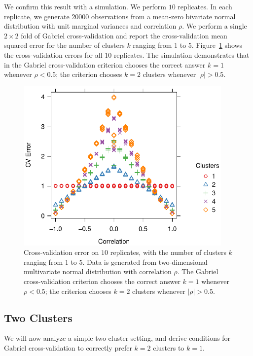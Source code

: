 \documentclass[11pt]{article}
\begin{document}
We confirm this result with a simulation.  We perform $10$ replicates.  In each
replicate, we generate $20000$ observations from a mean-zero bivariate normal
distribution with unit marginal variances and correlation $\rho$.  We perform
a single $2 \times 2$ fold of Gabriel cross-validation and report the
cross-validation mean squared error for the number of clusters $k$ ranging
from $1$ to $5$.  Figure~\ref{fig:nullcorr-equal} shows the cross-validation
errors for all $10$ replicates.  The simulation demonstrates that in the
Gabriel cross-validation criterion chooses the correct answer $k = 1$ whenever
$\rho < 0.5$; the criterion chooses $k = 2$ clusters whenever $|\rho| > 0.5$.

\begin{figure}[H]
\centering
\includegraphics[width=25pc]{demo/nullcorr/equal.pdf}
\caption{Cross-validation error on $10$ replicates, with the number of
clusters $k$ ranging from $1$ to $5$.  Data is generated from two-dimensional
multivariate normal distribution with correlation $\rho$.  The Gabriel
cross-validation criterion chooses the correct answer $k = 1$ whenever
$\rho < 0.5$; the criterion chooses $k = 2$ clusters whenever $|\rho| > 0.5$.}
\label{fig:nullcorr-equal}
\end{figure}


\subsection{Two Clusters}

We will now analyze a simple two-cluster setting, and derive conditions for
Gabriel cross-validation to correctly prefer $k=2$ clusters to $k=1$.
\end{document}

